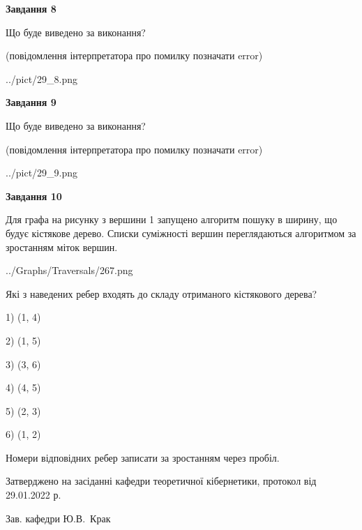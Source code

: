 \documentclass[12pt, ukrainian]{article}
\begin{document}
{\begin {large}
{\begin {center}\textbf{Завдання 8}\end {center}}\par
Що буде виведено за виконання?\par
 (повідомлення інтерпретатора про помилку позначати error)
\begin{center}
	{../pict/29_8.png}
\end{center}
\newpage

{\begin {center}\textbf{Завдання 9}\end {center}}\par
Що буде виведено за виконання?\par
 (повідомлення інтерпретатора про помилку позначати error)\par
\begin{center}
	{../pict/29_9.png}
\end{center}
\newpage

{\begin {center}\textbf{Завдання 10}\end {center}}\par
Для графа на рисунку з вершини 1 запущено алгоритм пошуку в ширину, що будує кістякове дерево. Списки суміжності вершин переглядаються алгоритмом за зростанням міток вершин.\par
\begin{center}
	{../Graphs/Traversals/267.png}
\end{center}
\par Які з наведених ребер входять до складу отриманого кістякового дерева?\par
1) (1, 4)\par
2) (1, 5)\par
3) (3, 6)\par
4) (4, 5)\par
5) (2, 3)\par
6) (1, 2)\par
{\vskip 15pt} Номери відповідних ребер записати за зростанням через пробіл.\par
\newpage


\end {large}
}
{\smallskip \begin {small} Затверджено на засіданні кафедри теоретичної кібернетики, протокол  від   29.01.2022 р.\par\smallskip\smallskip
{\parbox {6.5 cm}{Зав. кафедри \dotfill Ю.В.~Крак}} \end{small}}
\end{document}
